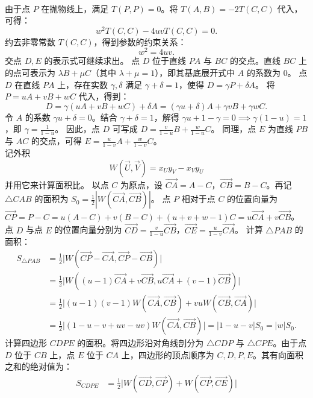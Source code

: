 \begin{solution}
\begin{align*}
\end{align*}
由于点 $P$ 在抛物线上，满足 $T(P,P) = 0$。将 $T(A,B) = -2T(C,C)$ 代入，可得：
\[ w^2 T(C,C) - 4uv T(C,C) = 0. \]
约去非零常数 $T(C,C)$，得到参数的约束关系：
\[ w^2 = 4uv. \]
交点 $D, E$ 的表示式可继续求出。
点 $D$ 位于直线 $PA$ 与 $BC$ 的交点。直线 $BC$ 上的点可表示为 $\lambda B + \mu C$（其中 $\lambda+\mu=1$），即其基底展开式中 $A$ 的系数为 $0$。
点 $D$ 在直线 $PA$ 上，存在实数 $\gamma, \delta$ 满足 $\gamma+\delta=1$，使得 $D = \gamma P + \delta A$。
将 $P = uA + vB + wC$ 代入，得到：
\[ D = \gamma(uA + vB + wC) + \delta A = (\gamma u + \delta)A + \gamma v B + \gamma w C. \]
令 $A$ 的系数 $\gamma u + \delta = 0$。结合 $\gamma + \delta = 1$，解得 $\gamma u + 1 - \gamma = 0 \implies \gamma(1-u) = 1$，即 $\gamma = \frac{1}{1-u}$。
因此，点 $D$ 可写成 $D = \frac{v}{1-u}B + \frac{w}{1-u}C$。
同理，点 $E$ 为直线 $PB$ 与 $AC$ 的交点，可得 $E = \frac{u}{1-v}A + \frac{w}{1-v}C$。\\
记外积
\[ W(\vec{U}, \vec{V}) = x_U y_V - x_V y_U \]
并用它来计算面积比。
以点 $C$ 为原点，设 $\overrightarrow{CA} = A-C$，$\overrightarrow{CB} = B-C$。再记 $\triangle CAB$ 的面积为 $S_0 = \frac{1}{2} |W(\overrightarrow{CA}, \overrightarrow{CB})|$。
点 $P$ 相对于点 $C$ 的位置向量为 $\overrightarrow{CP} = P - C = u(A-C) + v(B-C) + (u+v+w-1)C = u\overrightarrow{CA} + v\overrightarrow{CB}$。
点 $D$ 与点 $E$ 的位置向量分别为 $\overrightarrow{CD} = \frac{v}{1-u}\overrightarrow{CB}$，$\overrightarrow{CE} = \frac{u}{1-v}\overrightarrow{CA}$。
计算 $\triangle PAB$ 的面积：
\begin{align*}
S_{\triangle PAB} &= \frac{1}{2} \big|W(\overrightarrow{CP}-\overrightarrow{CA}, \overrightarrow{CP}-\overrightarrow{CB})\big| \\
&= \frac{1}{2} \big|W((u-1)\overrightarrow{CA} + v\overrightarrow{CB}, u\overrightarrow{CA} + (v-1)\overrightarrow{CB})\big| \\
&= \frac{1}{2} \big|(u-1)(v-1) W(\overrightarrow{CA}, \overrightarrow{CB}) + vu W(\overrightarrow{CB}, \overrightarrow{CA})\big| \\
&= \frac{1}{2} \big|(1-u-v+uv - uv) W(\overrightarrow{CA}, \overrightarrow{CB})\big| = |1-u-v| S_0 = |w| S_0.
\end{align*}
计算四边形 $CDPE$ 的面积。将四边形沿对角线剖分为 $\triangle CDP$ 与 $\triangle CPE$。由于点 $D$ 位于 $CB$ 上，点 $E$ 位于 $CA$ 上，四边形的顶点顺序为 $C, D, P, E$。其有向面积之和的绝对值为：
\begin{align*}
S_{CDPE} &= \frac{1}{2} \big|W(\overrightarrow{CD}, \overrightarrow{CP}) + W(\overrightarrow{CP}, \overrightarrow{CE})\big| \\

\end{align*}
\end{solution}
